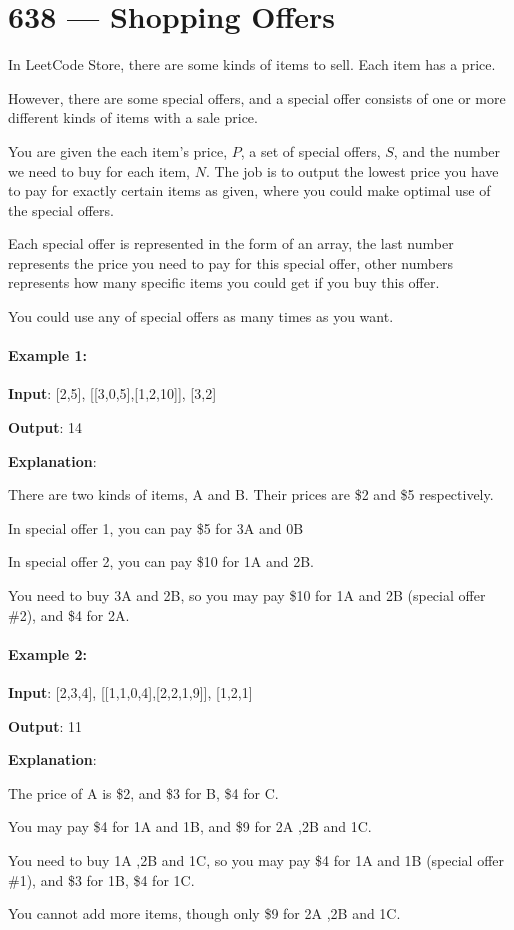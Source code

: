 \section{638 --- Shopping Offers}
In LeetCode Store, there are some kinds of items to sell. Each item has a price.

However, there are some special offers, and a special offer consists of one or more different kinds of items with a sale price.

You are given the each item's price, $P$, a set of special offers, $S$, and the number we need to buy for each item, $N$. The job is to output the lowest price you have to pay for exactly certain items as given, where you could make optimal use of the special offers.

Each special offer is represented in the form of an array, the last number represents the price you need to pay for this special offer, other numbers represents how many specific items you could get if you buy this offer.

You could use any of special offers as many times as you want.

\paragraph{Example 1:}

\begin{flushleft}
\textbf{Input}: [2,5], [[3,0,5],[1,2,10]], [3,2]

\textbf{Output}: 14

\textbf{Explanation}:
 
There are two kinds of items, A and B. Their prices are \$2 and \$5 respectively. 

In special offer 1, you can pay \$5 for 3A and 0B

In special offer 2, you can pay \$10 for 1A and 2B. 

You need to buy 3A and 2B, so you may pay \$10 for 1A and 2B (special offer \#2), and \$4 for 2A.
\end{flushleft}

\paragraph{Example 2:}

\begin{flushleft}
\textbf{Input}: [2,3,4], [[1,1,0,4],[2,2,1,9]], [1,2,1]

\textbf{Output}: 11

\textbf{Explanation}: 

The price of A is \$2, and \$3 for B, \$4 for C. 

You may pay \$4 for 1A and 1B, and \$9 for 2A ,2B and 1C. 

You need to buy 1A ,2B and 1C, so you may pay \$4 for 1A and 1B (special offer \#1), and \$3 for 1B, \$4 for 1C. 

You cannot add more items, though only \$9 for 2A ,2B and 1C.
\end{flushleft}

